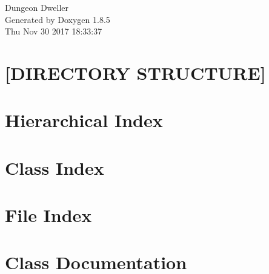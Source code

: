 \documentclass[twoside]{book}
\newcommand{\clearemptydoublepage}{%
  \newpage{\pagestyle{empty}\cleardoublepage}%
}
\begin{document}
\hypersetup{pageanchor=false}
\begin{titlepage}
\vspace*{7cm}
\begin{center}%
{\Large Dungeon Dweller }\\
\vspace*{1cm}
{\large Generated by Doxygen 1.8.5}\\
\vspace*{0.5cm}
{\small Thu Nov 30 2017 18:33:37}\\
\end{center}
\end{titlepage}
\clearemptydoublepage
\tableofcontents
\clearemptydoublepage
{}
\hypersetup{pageanchor=true}

\chapter{\mbox{[}D\-I\-R\-E\-C\-T\-O\-R\-Y S\-T\-R\-U\-C\-T\-U\-R\-E\mbox{]}}
\label{md__home_rigt2720_Kodika_README}
\hypertarget{md__home_rigt2720_Kodika_README}{}

\chapter{Hierarchical Index}

\chapter{Class Index}

\chapter{File Index}

\chapter{Class Documentation}

























































\end{document}
